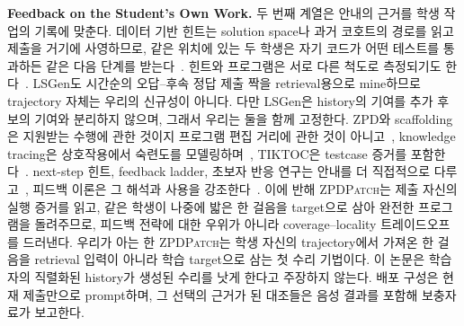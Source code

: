 \documentclass[10pt,conference]{IEEEtran}
\begin{document}
\noindent\textbf{Feedback on the Student's Own Work.} 두 번째 계열은 안내의 근거를 학생 작업의 기록에 맞춘다. 데이터 기반 힌트는 solution space나 과거 코호트의 경로를 읽고 제출을 거기에 사영하므로, 같은 위치에 있는 두 학생은 자기 코드가 어떤 테스트를 통과하든 같은 다음 단계를 받는다~\cite{rivers2017data,price2017isnap,roest2024next}. 힌트와 프로그램은 서로 다른 척도로 측정되기도 한다~\cite{yi2017feasibility,koutcheme2024benchmarking,keuning2018systematic}. LSGen도 시간순의 오답--후속 정답 제출 짝을 retrieval용으로 mine하므로~\cite{dai2026learner} trajectory 자체는 우리의 신규성이 아니다. 다만 LSGen은 history의 기여를 추가 후보의 기여와 분리하지 않으며, 그래서 우리는 둘을 함께 고정한다. ZPD와 scaffolding은 지원받는 수행에 관한 것이지 프로그램 편집 거리에 관한 것이 아니고~\cite{cole1978mind,murray2002toward,chounta2017grey,schulze2024beyond}, knowledge tracing은 상호작용에서 숙련도를 모델링하며~\cite{corbett1994knowledge,piech2015deep,ghosh2020context}, TIKTOC은 testcase 증거를 포함한다~\cite{duan2024tiktoc}. next-step 힌트, feedback ladder, 초보자 반응 연구는 안내를 더 직접적으로 다루고~\cite{roest2024next,heickal2024generating,xiao2024exploring}, 피드백 이론은 그 해석과 사용을 강조한다~\cite{narciss2008feedback,hattie2007power,shute2008focus,aleven2000limitations}. 이에 반해 \textsc{ZPDPatch}는 제출 자신의 실행 증거를 읽고, 같은 학생이 나중에 밟은 한 걸음을 target으로 삼아 완전한 프로그램을 돌려주므로, 피드백 전략에 대한 우위가 아니라 coverage--locality 트레이드오프를 드러낸다. 우리가 아는 한 \textsc{ZPDPatch}는 학생 자신의 trajectory에서 가져온 한 걸음을 retrieval 입력이 아니라 학습 target으로 삼는 첫 수리 기법이다. 이 논문은 학습자의 직렬화된 history가 생성된 수리를 낫게 한다고 주장하지 않는다. 배포 구성은 현재 제출만으로 prompt하며, 그 선택의 근거가 된 대조들은 음성 결과를 포함해 보충자료가 보고한다.
\end{document}
